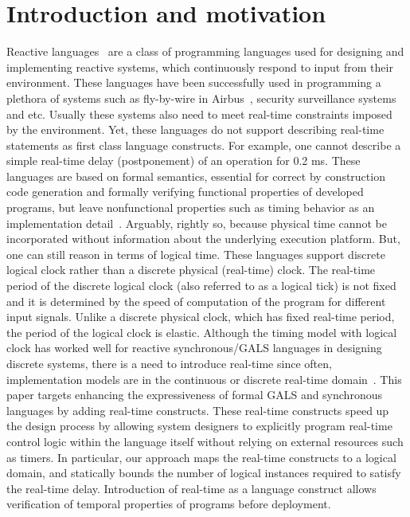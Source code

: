 \section{Introduction and motivation}
\label{sec:intr-motiv}

Reactive languages~\cite{gber931,amal10} are a class of programming
languages used for designing and implementing reactive systems, which
continuously respond to input from their environment. These languages
have been successfully used in programming a plethora of systems such as
fly-by-wire in Airbus~\cite{eairbus}, security surveillance
systems~\cite{amal121} and etc. Usually these systems also need to meet
real-time constraints imposed by the environment. Yet, these languages
do not support describing real-time statements as first class language
constructs.  For example, one cannot describe a simple real-time delay
(postponement) of an operation for 0.2 ms. These languages are based on
formal semantics, essential for correct by construction code generation
and formally verifying functional properties of developed programs, but
leave nonfunctional properties such as timing behavior as an
implementation detail~\cite{boldt07}. Arguably, rightly so, because
physical time cannot be incorporated without information about the
underlying execution platform.  But, one can still reason in terms of
logical time. These languages support discrete logical clock rather than
a discrete physical (real-time) clock. The real-time period of the
discrete logical clock (also referred to as a logical tick) is not fixed
and it is determined by the speed of computation of the program for
different input signals. Unlike a discrete physical clock, which has
fixed real-time period, the period of the logical clock is elastic.
Although the timing model with logical clock has worked well for
reactive synchronous/GALS languages in designing discrete systems, there
is a need to introduce real-time since often, implementation models are
in the continuous or discrete real-time
domain~\cite{DBLP:journals/pieee/SifakisTY03}. This paper targets
enhancing the expressiveness of formal GALS and synchronous languages by
adding real-time constructs. These real-time constructs speed up the
design process by allowing system designers to explicitly program
real-time control logic within the language itself without relying on
external resources such as timers. In particular, our approach maps the
real-time constructs to a logical domain, and statically bounds the
number of logical instances required to satisfy the real-time delay.
Introduction of real-time as a language construct allows verification of
temporal properties of programs before deployment.

